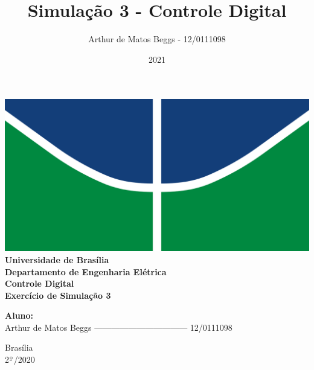 \documentclass{article}
\title{Simulação 3 - Controle Digital}
\author{Arthur de Matos Beggs - 12/0111098}
\date{2021}
\newcommand{\ubar}[1]{\underaccent{\bar}{#1}}
\begin{document}
\begin{titlepage}
    \begin{center}
        \centering
        \includegraphics[width=.7\linewidth]{images/logo_unb.png}\\[0.5cm]
        {\large \textbf{Universidade de Brasília}}\\[0.2cm]
        {\large \textbf{Departamento de Engenharia Elétrica}}\\[0.2cm]
        {\large \textbf{Controle Digital}}\\[4.8cm]
        {\bf \huge {Exercício de Simulação 3}}\\[0.2cm]
        {\bf \large {}}
    \end{center}

    \vspace{5cm}
    \hspace{2cm} {\noindent \bf \large {Aluno:}}\\
    \vspace{0.8cm}
    \hspace{2.35cm} {\large Arthur de Matos Beggs --------------------------------- 12/0111098}\\[1cm]

    \begin{center}
        {\large Brasília}\\
        {\large 2$^{\ubar{\circ}}$/2020}
    \end{center}

\end{titlepage}

\clearpage %

\setcounter{page}{2}
\end{document}
